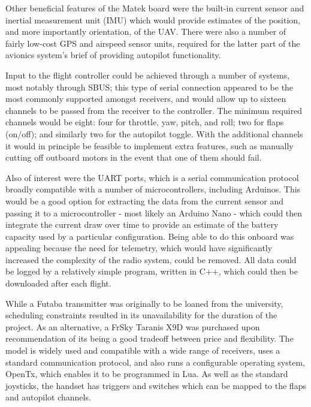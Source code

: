 \documentclass[../../main.tex]{subfiles}
\begin{document}
Other beneficial features of the Matek board were the built-in current sensor and inertial measurement unit (IMU) which would provide estimates of the position, and more importantly orientation, of the UAV.
There were also a number of fairly low-cost GPS and airspeed sensor units, required for the latter part of the avionics system’s brief of providing autopilot functionality. 


Input to the flight controller could be achieved through a number of systems, most notably through SBUS; this type of serial connection appeared to be the most commonly supported amongst receivers, and would allow up to sixteen channels to be passed from the receiver to the controller.
The minimum required channels would be eight: four for throttle, yaw, pitch, and roll; two for flaps (on/off); and similarly two for the autopilot toggle.
With the additional channels it would in principle be feasible to implement extra features, such as manually cutting off outboard motors in the event that one of them should fail. 

Also of interest were the UART ports, which is a serial communication protocol broadly compatible with a number of microcontrollers, including Arduinos.
This would be a good option for extracting the data from the current sensor and passing it to a microcontroller - most likely an Arduino Nano - which could then integrate the current draw over time to provide an estimate of the battery capacity used by a particular configuration.
Being able to do this onboard was appealing because the need for telemetry, which would have significantly increased the complexity of the radio system, could be removed.
All data could be logged by a relatively simple program, written in C++, which could then be downloaded after each flight. 


While a Futaba transmitter was originally to be loaned from the university, scheduling constraints resulted in its unavailability for the duration of the project.
As an alternative, a FrSky Taranis X9D was purchased upon recommendation of its being a good tradeoff between price and flexibility.
The model is widely used and compatible with a wide range of receivers, uses a standard communication protocol, and also runs a configurable operating system, OpenTx, which enables it to be programmed in Lua.
As well as the standard joysticks, the handset has triggers and switches which can be mapped to the flaps and autopilot channels. 
\end{document}
